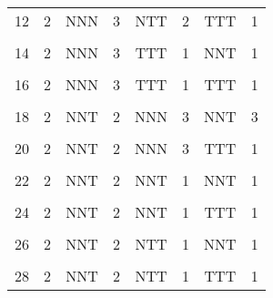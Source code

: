 \begin{table}[h!]
{\begin{tabular}[t]{cccccccc}
			12 & 2 & NNN & 3 & NTT & 2 & TTT & 1\\
			\cellcolor{gray!6}{13} & \cellcolor{gray!6}{2} & \cellcolor{gray!6}{NNN} & \cellcolor{gray!6}{3} & \cellcolor{gray!6}{TTT} & \cellcolor{gray!6}{1} & \cellcolor{gray!6}{NNN} & \cellcolor{gray!6}{2}\\
			14 & 2 & NNN & 3 & TTT & 1 & NNT & 1\\
			\cellcolor{gray!6}{15} & \cellcolor{gray!6}{2} & \cellcolor{gray!6}{NNN} & \cellcolor{gray!6}{3} & \cellcolor{gray!6}{TTT} & \cellcolor{gray!6}{1} & \cellcolor{gray!6}{NTT} & \cellcolor{gray!6}{1}\\
			16 & 2 & NNN & 3 & TTT & 1 & TTT & 1\\
			\cellcolor{gray!6}{17} & \cellcolor{gray!6}{2} & \cellcolor{gray!6}{NNT} & \cellcolor{gray!6}{2} & \cellcolor{gray!6}{NNN} & \cellcolor{gray!6}{3} & \cellcolor{gray!6}{NNN} & \cellcolor{gray!6}{4}\\
			18 & 2 & NNT & 2 & NNN & 3 & NNT & 3\\
			\cellcolor{gray!6}{19} & \cellcolor{gray!6}{2} & \cellcolor{gray!6}{NNT} & \cellcolor{gray!6}{2} & \cellcolor{gray!6}{NNN} & \cellcolor{gray!6}{3} & \cellcolor{gray!6}{NTT} & \cellcolor{gray!6}{2}\\
			20 & 2 & NNT & 2 & NNN & 3 & TTT & 1\\
			\cellcolor{gray!6}{21} & \cellcolor{gray!6}{2} & \cellcolor{gray!6}{NNT} & \cellcolor{gray!6}{2} & \cellcolor{gray!6}{NNT} & \cellcolor{gray!6}{1} & \cellcolor{gray!6}{NNN} & \cellcolor{gray!6}{2}\\
			22 & 2 & NNT & 2 & NNT & 1 & NNT & 1\\
			\cellcolor{gray!6}{23} & \cellcolor{gray!6}{2} & \cellcolor{gray!6}{NNT} & \cellcolor{gray!6}{2} & \cellcolor{gray!6}{NNT} & \cellcolor{gray!6}{1} & \cellcolor{gray!6}{NTT} & \cellcolor{gray!6}{1}\\
			24 & 2 & NNT & 2 & NNT & 1 & TTT & 1\\
			\cellcolor{gray!6}{25} & \cellcolor{gray!6}{2} & \cellcolor{gray!6}{NNT} & \cellcolor{gray!6}{2} & \cellcolor{gray!6}{NTT} & \cellcolor{gray!6}{1} & \cellcolor{gray!6}{NNN} & \cellcolor{gray!6}{1}\\
			26 & 2 & NNT & 2 & NTT & 1 & NNT & 1\\
			\cellcolor{gray!6}{27} & \cellcolor{gray!6}{2} & \cellcolor{gray!6}{NNT} & \cellcolor{gray!6}{2} & \cellcolor{gray!6}{NTT} & \cellcolor{gray!6}{1} & \cellcolor{gray!6}{NTT} & \cellcolor{gray!6}{1}\\
			28 & 2 & NNT & 2 & NTT & 1 & TTT & 1\\

\end{tabular}}
\end{table}
